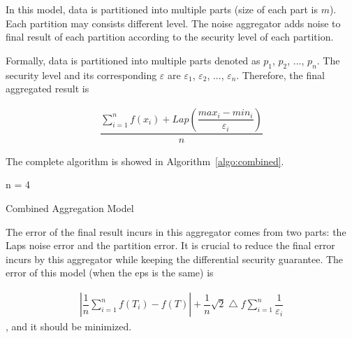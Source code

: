 In this model, data is partitioned into multiple parts (size of each part is 
$m$). Each partition may consists
different level. The noise aggregator adds noise to final result of each 
partition
according to the security level of each partition.

Formally, data is partitioned into multiple parts denoted as $p_1$, $p_2$, ..., 
$p_n$.
The security level and its corresponding $\varepsilon$ are $\varepsilon_1$,
$\varepsilon_2$, ..., $\varepsilon_n$. Therefore, the final aggregated result
is

\begin{align}
\dfrac{\sum\limits_{i=1}^n f(x_i) + Lap(\dfrac{max_i - 
min_i}{\varepsilon_i})}{n}
\end{align}

The complete algorithm is showed in Algorithm~\ref{algo:combined}.

\begin{algorithm}[t]
\SetAlgoLined
{}
  n = 4

 \caption{Combined Aggregation Model}
 \label{algo:combined}
\end{algorithm}

The error of the final result incurs in this aggregator comes from two parts:
the Laps noise error and the partition error. It is crucial to reduce the final
error incurs by this aggregator while keeping the differential security 
guarantee.
The error of this model (when the eps is the same) is

\begin{align}
|\dfrac{1}{n}\sum\limits_{i=1}^n f(T_i) - f(T)| + 
\dfrac{1}{n}\sqrt{2}\bigtriangleup{f}\sum\limits_{i=1}^n\dfrac{1}{\varepsilon_i}
\end{align}, and it should be minimized.

